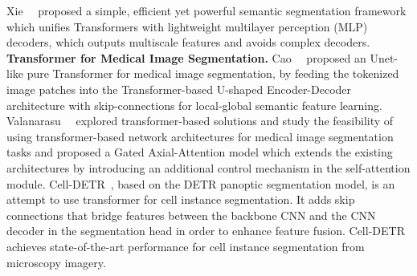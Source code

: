 Xie~\etal~ proposed a simple, efficient yet powerful semantic segmentation framework which unifies Transformers with lightweight multilayer perception (MLP) decoders, which outputs multiscale features and avoids complex decoders.
\noindent\textbf{Transformer for Medical Image Segmentation.}
Cao~\etal~ proposed an Unet-like pure Transformer for medical image segmentation, by feeding the tokenized image patches into the Transformer-based U-shaped Encoder-Decoder architecture with skip-connections for local-global semantic feature learning. Valanarasu~\etal~ explored transformer-based solutions and study the feasibility of using transformer-based network architectures for medical image segmentation tasks and proposed a Gated Axial-Attention model which extends the existing architectures by introducing an additional control mechanism in the self-attention module. Cell-DETR~, based on the DETR panoptic segmentation model, is an attempt to use transformer for cell instance segmentation. It adds skip connections that bridge features between the backbone CNN and the CNN decoder in the segmentation head in order to enhance feature fusion. Cell-DETR achieves state-of-the-art performance for cell instance segmentation from microscopy imagery.

